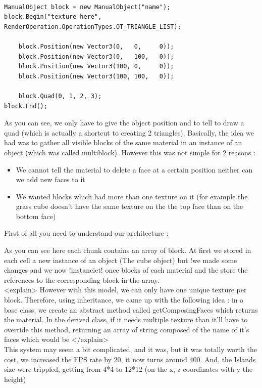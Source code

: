 \documentclass[article]{report}             %
\begin{document}
				\begin{lstlisting}
				
ManualObject block = new ManualObject("name");
block.Begin("texture here", RenderOperation.OperationTypes.OT_TRIANGLE_LIST);

	block.Position(new Vector3(0,   0,     0));
	block.Position(new Vector3(0,   100,   0));
	block.Position(new Vector3(100, 0,     0));
	block.Position(new Vector3(100, 100,   0));

	block.Quad(0, 1, 2, 3);
block.End();

				\end{lstlisting}
				As you can see, we only have to give the object position and to tell to draw a quad (which is actually a shortcut to creating 2 triangles).
				Basically, the idea we had was to gather all visible blocks of the same material in an instance of an object (which was called multiblock). However this was not simple for 2 reasons :
				\begin{itemize}
					\item We cannot tell the material to delete a face at a certain position neither can we add new faces to it
					\item We wanted blocks which had more than one texture on it (for example the grass cube doesn't have the same texture on the the top face than on the bottom face)
				 \end {itemize}



First of all you need to understand our architecture : 

As you can see here each chunk contains an array of block. At first we stored in each cell a new instance of an object (The cube object) but
!we made some changes and we now !instanciet! once blocks of each material and the store the references to the corresponding block in the array.\\
			<explain>
However with this model, we can only have one unique texture per block. Therefore, using inheritance, we came 
up with the following idea : in a base class, we create an abstract method called getComposingFaces which returns the material.
In the derived class, if it needs multiple texture than it'll have to override this method, returning an array of string composed of the name of it's faces which would be 
</explain> \\

This system may seem a bit complicated, and it was, but it was totally worth the cost, we increased the FPS rate by 20, it now turns around 400. And, the Islands size were trippled, getting from 4*4 to 12*12 (on the x, z coordinates with y the height)
\end{document}
